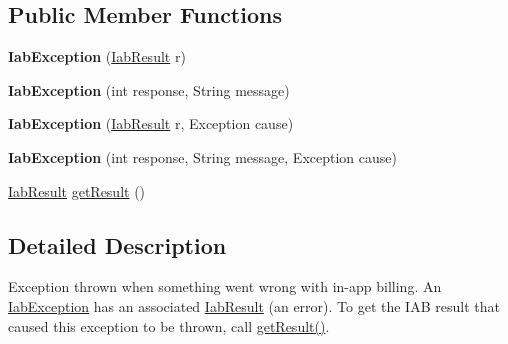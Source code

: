 \subsection*{Public Member Functions}
\begin{DoxyCompactItemize}
\item 
\mbox{\label{classorg_1_1cocos2dx_1_1plugin_1_1util_1_1IabException_a7f9ec2e4582a367a19fbb470cc964de9}} 
{\bfseries Iab\+Exception} (\hyperlink{classorg_1_1cocos2dx_1_1plugin_1_1util_1_1IabResult}{Iab\+Result} r)
\item 
\mbox{\label{classorg_1_1cocos2dx_1_1plugin_1_1util_1_1IabException_a8c0fd9c26638eef77176b946ff0c37f1}} 
{\bfseries Iab\+Exception} (int response, String message)
\item 
\mbox{\label{classorg_1_1cocos2dx_1_1plugin_1_1util_1_1IabException_ac918fb5e427e35c30ef6cb330a5c4a00}} 
{\bfseries Iab\+Exception} (\hyperlink{classorg_1_1cocos2dx_1_1plugin_1_1util_1_1IabResult}{Iab\+Result} r, Exception cause)
\item 
\mbox{\label{classorg_1_1cocos2dx_1_1plugin_1_1util_1_1IabException_a860341d001f611bdf3014d1c8bd422ba}} 
{\bfseries Iab\+Exception} (int response, String message, Exception cause)
\item 
\hyperlink{classorg_1_1cocos2dx_1_1plugin_1_1util_1_1IabResult}{Iab\+Result} \hyperlink{classorg_1_1cocos2dx_1_1plugin_1_1util_1_1IabException_ab7c7e5a8c0cbecfc90df970594f77c76}{get\+Result} ()
\end{DoxyCompactItemize}


\subsection{Detailed Description}
Exception thrown when something went wrong with in-\/app billing. An \hyperlink{classorg_1_1cocos2dx_1_1plugin_1_1util_1_1IabException}{Iab\+Exception} has an associated \hyperlink{classorg_1_1cocos2dx_1_1plugin_1_1util_1_1IabResult}{Iab\+Result} (an error). To get the I\+AB result that caused this exception to be thrown, call \hyperlink{classorg_1_1cocos2dx_1_1plugin_1_1util_1_1IabException_ab7c7e5a8c0cbecfc90df970594f77c76}{get\+Result()}. 

